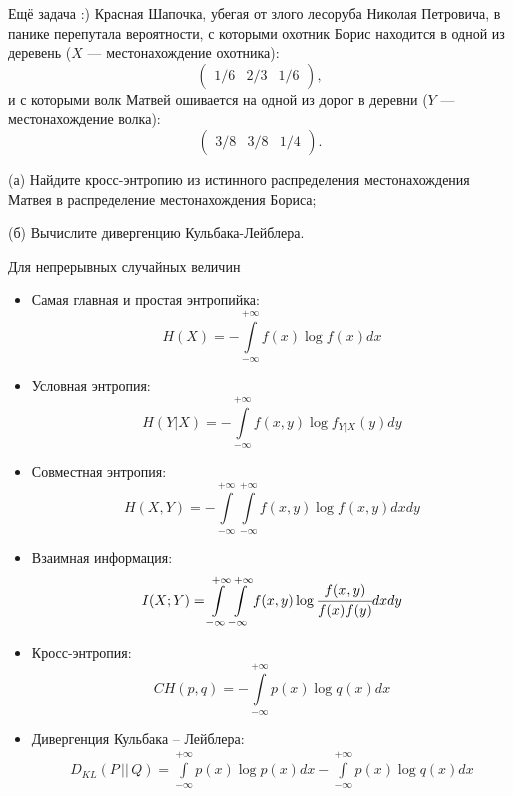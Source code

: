 \documentclass[final]{beamer}
\newlength{\onecolwid}
\newlength{\twocolwid}
\begin{document}
\begin{frame}[t]
\begin{columns}[t]
\begin{column}{\twocolwid}
\begin{columns}[t,totalwidth=\twocolwid]
\begin{column}{\onecolwid}
\begin{alertblock}{Ещё задача :)}
	Красная Шапочка, убегая от злого лесоруба Николая Петровича, в панике перепутала вероятности, с которыми охотник Борис находится в одной из деревень ($X$ --- местонахождение охотника):
\[\begin{pmatrix}
    1/6 & 2/3 & 1/6
\end{pmatrix} , \] и с которыми волк Матвей ошивается на одной из дорог в деревни ($Y$ --- местонахождение волка):
\[\begin{pmatrix}
    3/8 & 3/8 & 1/4 
\end{pmatrix} .\]

(а) Найдите кросс-энтропию из истинного распределения местонахождения Матвея в распределение местонахождения Бориса;

(б) Вычислите дивергенцию Кульбака-Лейблера.
\end{alertblock}

\begin{block}{Для непрерывных случайных величин}

\begin{itemize}
	\item Самая главная и простая энтропийка:
	\[H(X)=-\int\limits_{-\infty}^{+\infty} f(x)\log f(x)dx \]
	\item Условная энтропия:
	\[H(Y|X)=-\int\limits_{-\infty}^{+\infty} f(x, y)\log f_{Y|X}(y)dy \]
	\item Совместная энтропия:
	\[H(X, Y)=-\int\limits_{-\infty}^{+\infty} \int\limits_{-\infty}^{+\infty} f(x, y)\log f(x, y)dxdy \]
	\item Взаимная информация:
	\[I(X; Y)=\int\limits_{-\infty}^{+\infty} \int\limits_{-\infty}^{+\infty} f(x, y) \log \cfrac{f(x, y)}{f(x)f(y)}dxdy \]
	\item Кросс-энтропия:
	\[CH(p, q)=-\int\limits_{-\infty}^{+\infty}p(x)\log q(x) dx \]
	\item Дивергенция Кульбака -- Лейблера:
	\begin{multline*}
		D_{KL}(P\, ||\, Q)=\int\limits_{-\infty}^{+\infty} p(x)\log p(x)dx -\int\limits_{-\infty}^{+\infty} p(x)\log q(x)dx
	\end{multline*}
\end{itemize}
\end{block}



\end{column}
\end{columns}
\end{column}
\end{columns}
\end{frame}
\end{document}
